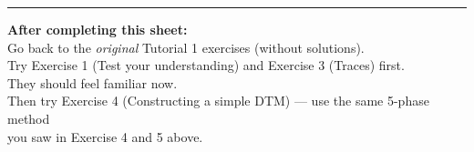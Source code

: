 \documentclass[11pt,a4paper]{article}
\begin{document}
\bigskip
\hrule
\bigskip

\begin{center}
\textbf{After completing this sheet:}\\[0.5em]
Go back to the \emph{original} Tutorial 1 exercises (without solutions).\\
Try Exercise 1 (Test your understanding) and Exercise 3 (Traces) first.\\
They should feel familiar now.\\[0.5em]
Then try Exercise 4 (Constructing a simple DTM) --- use the same 5-phase method\\
you saw in Exercise 4 and 5 above.
\end{center}
\end{document}
